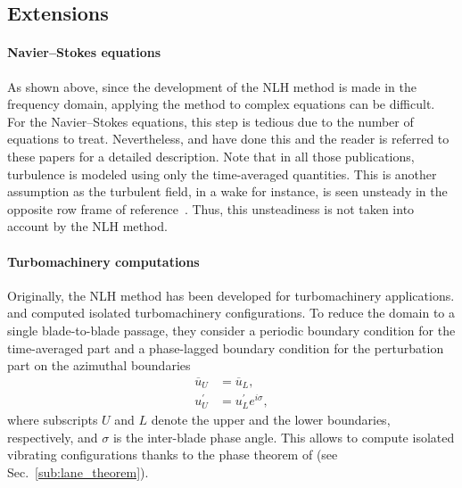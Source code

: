 \subsection{Extensions}

\paragraph{Navier--Stokes equations}
As shown above, since the development of the NLH
method is made in the frequency domain, applying the method to
complex equations can be difficult. For the Navier--Stokes equations,
this step is tedious due to the number of equations to treat. Nevertheless, 
\citet{He1998, Chen2001, He2002} and \citet{Vilmin2006} have
done this and the reader is referred to these papers
for a detailed description.
Note that in all those publications, turbulence is modeled
using only the time-averaged quantities.
This is another assumption as the turbulent field, in a wake
for instance, is seen unsteady in the opposite row frame
of reference~\cite{Lakshminarayana1980}. Thus, this
unsteadiness is not taken into account by the NLH method.

\paragraph{Turbomachinery computations}
Originally, the NLH method has been developed for 
turbomachinery applications. \citet{He1998} and
\citet{Ning1998} computed isolated turbomachinery
configurations. To reduce the domain to a single 
blade-to-blade passage, they consider a periodic
boundary condition for the time-averaged part and a
phase-lagged boundary condition for the perturbation part on the
azimuthal boundaries
\begin{equation}
    \begin{split}
    	\overline{u}_U &= \overline{u}_L, \\
    	u^\prime_U &= u^\prime_L e^{i \sigma},
    \end{split}
\end{equation}
where subscripts $U$ and $L$ denote 
the upper and the lower boundaries, respectively, and $\sigma$ is the
inter-blade phase angle. This allows to compute
isolated vibrating configurations thanks to 
the phase theorem of \citet{Lane1956} (see Sec.~\ref{sub:lane_theorem}).

